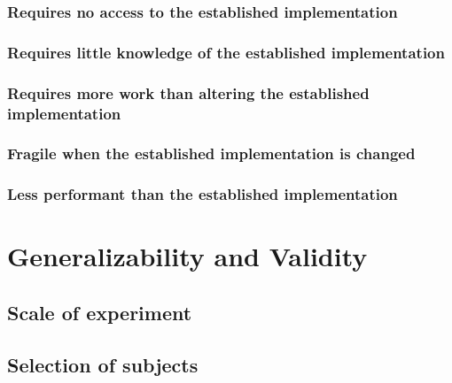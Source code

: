 \subsubsection{Requires no access to the established implementation}

\subsubsection{Requires little knowledge of the established implementation}

\subsubsection{Requires more work than altering the established
  implementation}

\subsubsection{Fragile when the established implementation is changed}

\subsubsection{Less performant than the established implementation}

\section{Generalizability and Validity}

\subsection{Scale of experiment}


\subsection{Selection of subjects}


